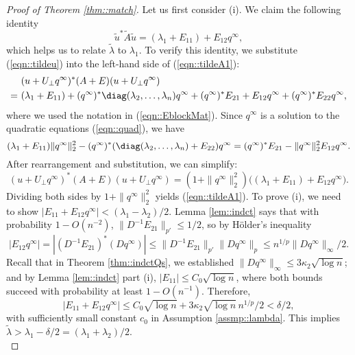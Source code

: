 \documentclass[12pt]{article}%
\theoremstyle{plain}%
\theoremstyle{remark}
\begin{document}
\begin{proof}[Proof of Theorem \ref{thm::match}]
Let us first consider (i). We claim the following identity
\begin{equation}\label{eqn::tildeA1}
\tilde{u}^* \tilde{A} \tilde{u} = (\lambda_1 + E_{11}) + E_{12}q^\infty,
\end{equation}
which helps us to relate $\tilde{\lambda}$ to $\lambda_1$. To verify this identity, we substitute (\ref{eqn::tildeu}) into the left-hand side of (\ref{eqn::tildeA1}):
\begin{align*}
&~( u + U_\bot q^\infty)^* (A+E) ( u + U_\bot q^\infty) \\
= & ~ (\lambda_1 +E_{11}) + (q^\infty)^* \diag(\lambda_2,\ldots, \lambda_n)q^\infty + (q^\infty)^* E_{21} + E_{12}q^\infty + (q^\infty)^* E_{22}q^\infty,
\end{align*}
where we used the notation in (\ref{eqn::EblockMat}). Since $q^\infty$ is a solution to the quadratic equations (\ref{eqn::quad}), we have
\begin{equation*}
(\lambda_1 + E_{11}) \| q^\infty \|_2^2 - (q^\infty)^* (\diag(\lambda_2,\ldots, \lambda_n) + E_{22}) q^\infty = (q^\infty)^* E_{21} - \| q^\infty \|_2^2 E_{12}q^\infty.
\end{equation*}
After rearrangement and substitution, we can simplify:
\begin{equation*}
( u + U_\bot q^\infty)^* (A+E) ( u + U_\bot q^\infty) = (1 + \| q^\infty \|_2^2) \big( (\lambda_1 + E_{11}) + E_{12}q^\infty \big).
\end{equation*}
Dividing both sides by $1 + \| q^\infty \|_2^2$ yields (\ref{eqn::tildeA1}). To prove (i), we need to show $|E_{11} + E_{12}q^\infty| < ( \lambda_1-\lambda_2)/2$. Lemma \ref{lem::indct} says that with probability $1 - O(n^{-2})$, $\| D^{-1} E_{21} \|_{p'} \le 1/2$, so by H\"{o}lder's inequality
\begin{equation*}
| E_{12}q^\infty | = |(D^{-1}E_{21})^* (Dq^\infty) | \le \| D^{-1} E_{21} \|_{p'} \| D q^\infty \|_p \le n^{1/p} \| Dq^\infty \|_\infty / 2.
\end{equation*}
Recall that in Theorem \ref{thm::indctQs}, we established $\| D q^\infty \|_\infty \le 3\kappa_2 \sqrt{\log n}$; and by Lemma \ref{lem::indct} part (i), $ | E_{11} | \le C_0 \sqrt{\log n}$, where both bounds succeed with probability at least $1 - O(n^{-1})$. Therefore, 
\begin{equation}\label{ineqn::match4}
| E_{11} + E_{12}q^\infty | \le C_0 \sqrt{\log n} + 3\kappa_2 \sqrt{\log n}\, n^{1/p} / 2 < \delta/2,
\end{equation}
with sufficiently small constant $c_0$ in Assumption \ref{assmp::lambda}. This implies $\tilde{\lambda} > \lambda_1 - \delta / 2 = (\lambda_1 + \lambda_2)/2$. \\

\end{proof}
\end{document}
